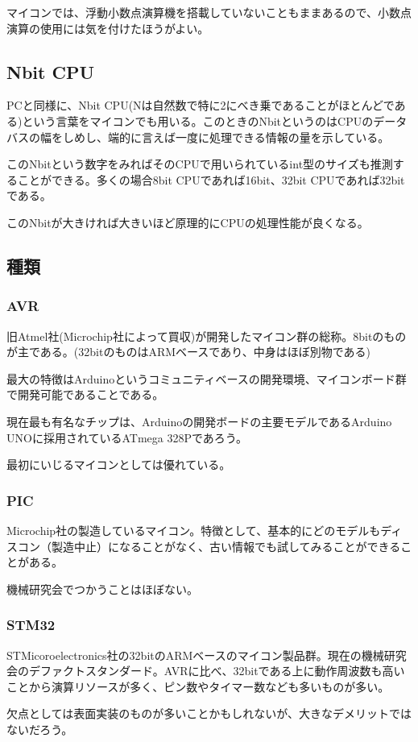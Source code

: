 \documentclass[a4paper,titlepage,here]{ujarticle}
\begin{document}
マイコンでは、浮動小数点演算機を搭載していないこともままあるので、小数点演算の使用には気を付けたほうがよい。
\subsection{Nbit CPU}
PCと同様に、Nbit CPU(Nは自然数で特に2にべき乗であることがほとんどである)という言葉をマイコンでも用いる。このときのNbitというのはCPUのデータバスの幅をしめし、端的に言えば一度に処理できる情報の量を示している。

このNbitという数字をみればそのCPUで用いられているint型のサイズも推測することができる。多くの場合8bit CPUであれば16bit、32bit CPUであれば32bitである。

このNbitが大きければ大きいほど原理的にCPUの処理性能が良くなる。
\subsection{種類}
\subsubsection{AVR}
旧Atmel社(Microchip社によって買収)が開発したマイコン群の総称。8bitのものが主である。(32bitのものはARMベースであり、中身はほぼ別物である)

最大の特徴はArduinoというコミュニティベースの開発環境、マイコンボード群で開発可能であることである。

現在最も有名なチップは、Arduinoの開発ボードの主要モデルであるArduino UNOに採用されているATmega 328Pであろう。

最初にいじるマイコンとしては優れている。
\subsubsection{PIC}
Microchip社の製造しているマイコン。特徴として、基本的にどのモデルもディスコン（製造中止）になることがなく、古い情報でも試してみることができることがある。

機械研究会でつかうことはほぼない。
\subsubsection{STM32}
STMicoroelectronics社の32bitのARMベースのマイコン製品群。現在の機械研究会のデファクトスタンダード。AVRに比べ、32bitである上に動作周波数も高いことから演算リソースが多く、ピン数やタイマー数なども多いものが多い。

欠点としては表面実装のものが多いことかもしれないが、大きなデメリットではないだろう。
\end{document}
